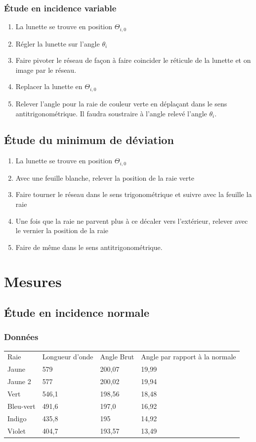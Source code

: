 \documentclass[a4paper,10pt,french]{scrartcl}
\begin{document}
\subsubsection{Étude en incidence variable}
\begin{enumerate}
 \item La lunette se trouve en position \(\Theta_{i,0}\)
 \item Régler la lunette sur l'angle \(\theta_i\)
 \item Faire pivoter le réseau de façon à faire coincider le réticule de la lunette et on image par le réseau.
 \item Replacer la lunette en \(\Theta_{i,0}\)
 \item Relever l'angle pour la raie de couleur verte en déplaçant dans le sens antitrigonométrique. Il faudra soustraire à l'angle relevé l'angle \(\theta_i\).
\end{enumerate}
\subsection{Étude du minimum de déviation}
\begin{enumerate}
 \item  La lunette se trouve en position \(\Theta_{i,0}\)
 \item Avec une feuille blanche, relever la position de la raie verte
 \item Faire tourner le réseau dans le sens trigonométrique et suivre avec la feuille la raie
 \item Une fois que la raie ne parvent plus à ce décaler vers l'extérieur, relever avec le vernier la position de la raie
 \item Faire de m\^eme dans le sens antitrigonométrique.
\end{enumerate}

\section{Mesures}
\subsection{Étude en incidence normale}
\subsubsection{Données}
\begin{center}
\begin{tabular}{llll}
Raie & Longueur d’onde & Angle Brut & Angle par rapport à la normale\\
Jaune & 579 & 200,07 & 19,99\\
Jaune 2 & 577 & 200,02 & 19,94\\
Vert & 546,1 & 198,56 & 18,48\\
Bleu-vert & 491,6 & 197,0 & 16,92\\
Indigo & 435,8 & 195 & 14,92\\
Violet & 404,7 & 193,57 & 13,49
\end{tabular}
\end{center}
\end{document}
